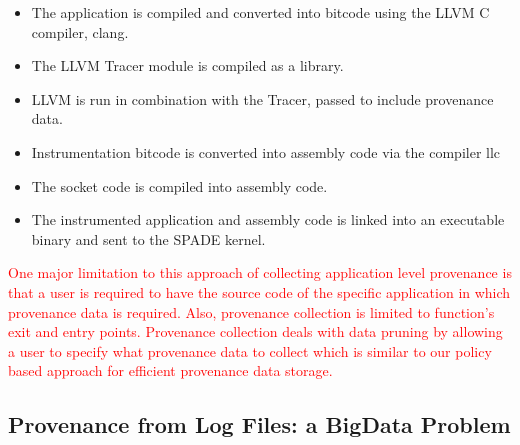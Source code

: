 \begin{itemize}
\item The application is compiled and converted into bitcode using the LLVM C compiler, clang.

\item The LLVM Tracer module is compiled as a library.

\item LLVM is run in combination with the Tracer, passed to include provenance data. 

\item Instrumentation bitcode is converted into assembly code via the compiler llc

\item The socket code is compiled into assembly code.


\item  The instrumented application and assembly code is linked into an executable binary and sent to the SPADE kernel.
\end{itemize}


\textcolor{red}{
One major limitation to this approach of collecting application level provenance is that a user is required to have the source code of the specific application in which provenance data is required. Also, provenance collection is limited to function's exit and entry points. Provenance collection deals with data pruning by allowing a user to specify what provenance data to collect which is similar to our policy based approach for efficient provenance data storage.}


\subsection{Provenance from Log Files: a BigData Problem}



